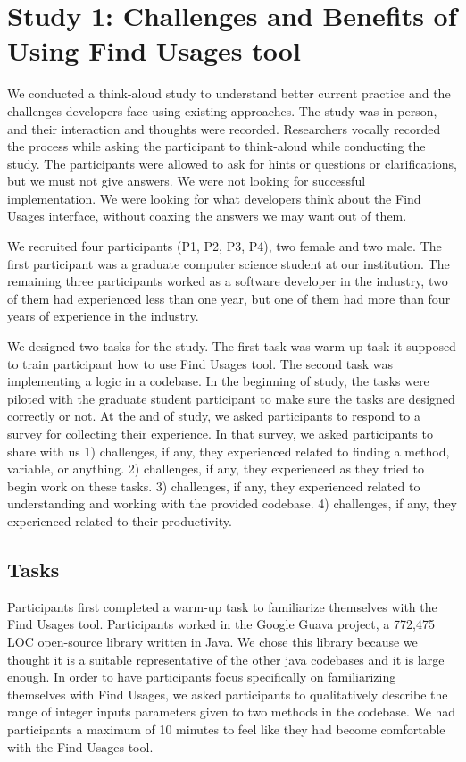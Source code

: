 \documentclass[conference]{IEEEtran}
\begin{document}
\section{Study 1: Challenges and Benefits of Using Find Usages tool}

We conducted a think-aloud study to understand better current practice and the challenges developers face using existing approaches. The study was in-person, and their interaction and thoughts were recorded. Researchers vocally recorded the process while asking the participant to think-aloud while conducting the study. The participants were allowed to ask for hints or questions or clarifications, but we must not give answers. We were not looking for successful implementation. We were looking for what developers think about the Find Usages interface, without coaxing the answers we may want out of them.\par
We recruited four participants (P1, P2, P3, P4), two female and two male. The first participant was a graduate computer science student at our institution. The remaining three participants worked as a software developer in the industry, two of them had experienced less than one year, but one of them had more than four years of experience in the industry.\par 
We designed two tasks for the study. The first task was warm-up task it supposed to train participant how to use Find Usages tool. The second task was implementing a logic in a codebase. In the beginning of study, the tasks were piloted with the graduate student participant to make sure the tasks are designed correctly or not. At the and of study, we asked participants to respond to a survey for collecting their experience. In that survey, we asked participants to share with us 1) challenges, if any, they experienced related to finding a method, variable, or anything. 2) challenges, if any, they experienced as they tried to begin work on these tasks. 3) challenges, if any, they experienced related to understanding and working with the provided codebase. 4) challenges, if any, they experienced related to their productivity.

\subsection{Tasks}
\label{tasks}

Participants first completed a warm-up task to familiarize themselves with the Find Usages tool. Participants worked in the Google Guava project, a 772,475 LOC open-source library written in Java. We chose this library because we thought it is a suitable representative of the other java codebases and it is large enough. In order to have participants focus specifically on familiarizing themselves with Find Usages, we asked participants to qualitatively describe the range of integer inputs parameters given to two methods in the codebase. We had participants a maximum of 10 minutes to feel like they had become comfortable with the Find Usages tool.\par
\end{document}
